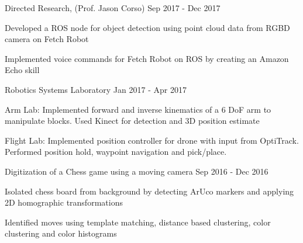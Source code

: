 

\begin{cventries2}

  \cventrymini
    {Directed Research, (Prof. Jason Corso)} %
    {Sep 2017 - Dec 2017} %
    {
      \begin{cvitems} 
        \item {Developed a ROS node for object detection using point cloud data from RGBD camera on Fetch Robot}
        \item{Implemented voice commands for Fetch Robot on ROS by creating an Amazon Echo skill}
      \end{cvitems}
    } %
\cventrymini
{Robotics Systems Laboratory} %
{Jan 2017 - Apr 2017} %
{
	\begin{cvitems} 
		\item {Arm Lab: Implemented forward and inverse kinematics of a 6 DoF arm to manipulate blocks. Used Kinect for detection and 3D position estimate}
		\item{Flight Lab: Implemented position controller for drone with input from OptiTrack. Performed position hold, waypoint navigation and pick/place.}
	\end{cvitems}
} %

\vspace{2mm}
	\cventrymini
	{Digitization of a Chess game using a moving camera} %
	{Sep 2016 - Dec 2016} %
	{
		\begin{cvitems} 
			\item {Isolated chess board from background by detecting ArUco markers and applying 2D homographic transformations}
			\item{Identified moves using template matching, distance based clustering, color clustering and color histograms}
		\end{cvitems}
	} %

\end{cventries2}    





